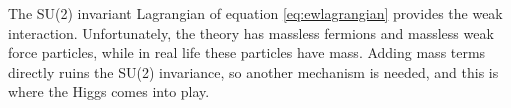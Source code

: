 The SU(2) invariant Lagrangian of equation \ref{eq:ewlagrangian} provides the weak interaction. Unfortunately, the theory has massless fermions and massless weak force particles, while in real life these particles have mass. Adding mass terms directly ruins the SU(2) invariance, so another mechanism is needed, and this is where the Higgs comes into play.  

